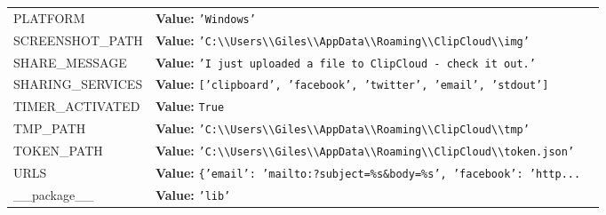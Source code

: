 \begin{longtable}{|p{\varnamewidth}|p{\vardescrwidth}|l}
\cline{1-2}
\raggedright P\-L\-A\-T\-F\-O\-R\-M\- & \raggedright \textbf{Value:} 
{\tt \texttt{'}\texttt{Windows}\texttt{'}}&\\
\cline{1-2}
\raggedright S\-C\-R\-E\-E\-N\-S\-H\-O\-T\-\_\-P\-A\-T\-H\- & \raggedright \textbf{Value:} 
{\tt \texttt{'}\texttt{C:{\textbackslash}{\textbackslash}Users{\textbackslash}{\textbackslash}Giles{\textbackslash}{\textbackslash}AppData{\textbackslash}{\textbackslash}Roaming{\textbackslash}{\textbackslash}ClipCloud{\textbackslash}{\textbackslash}img}\texttt{'}}&\\
\cline{1-2}
\raggedright S\-H\-A\-R\-E\-\_\-M\-E\-S\-S\-A\-G\-E\- & \raggedright \textbf{Value:} 
{\tt \texttt{'}\texttt{I just uploaded a file to ClipCloud - check it out.}\texttt{'}}&\\
\cline{1-2}
\raggedright S\-H\-A\-R\-I\-N\-G\-\_\-S\-E\-R\-V\-I\-C\-E\-S\- & \raggedright \textbf{Value:} 
{\tt \texttt{[}\texttt{'}\texttt{clipboard}\texttt{'}\texttt{, }\texttt{'}\texttt{facebook}\texttt{'}\texttt{, }\texttt{'}\texttt{twitter}\texttt{'}\texttt{, }\texttt{'}\texttt{email}\texttt{'}\texttt{, }\texttt{'}\texttt{stdout}\texttt{'}\texttt{]}}&\\
\cline{1-2}
\raggedright T\-I\-M\-E\-R\-\_\-A\-C\-T\-I\-V\-A\-T\-E\-D\- & \raggedright \textbf{Value:} 
{\tt True}&\\
\cline{1-2}
\raggedright T\-M\-P\-\_\-P\-A\-T\-H\- & \raggedright \textbf{Value:} 
{\tt \texttt{'}\texttt{C:{\textbackslash}{\textbackslash}Users{\textbackslash}{\textbackslash}Giles{\textbackslash}{\textbackslash}AppData{\textbackslash}{\textbackslash}Roaming{\textbackslash}{\textbackslash}ClipCloud{\textbackslash}{\textbackslash}tmp}\texttt{'}}&\\
\cline{1-2}
\raggedright T\-O\-K\-E\-N\-\_\-P\-A\-T\-H\- & \raggedright \textbf{Value:} 
{\tt \texttt{'}\texttt{C:{\textbackslash}{\textbackslash}Users{\textbackslash}{\textbackslash}Giles{\textbackslash}{\textbackslash}AppData{\textbackslash}{\textbackslash}Roaming{\textbackslash}{\textbackslash}ClipCloud{\textbackslash}{\textbackslash}token.json}\texttt{'}}&\\
\cline{1-2}
\raggedright U\-R\-L\-S\- & \raggedright \textbf{Value:} 
{\tt \texttt{\{}\texttt{'}\texttt{email}\texttt{'}\texttt{: }\texttt{'}\texttt{mailto:?subject=\%s\&body=\%s}\texttt{'}\texttt{, }\texttt{'}\texttt{facebook}\texttt{'}\texttt{: }\texttt{'}\texttt{http}\texttt{...}}&\\
\cline{1-2}
\raggedright \_\-\_\-p\-a\-c\-k\-a\-g\-e\-\_\-\_\- & \raggedright \textbf{Value:} 
{\tt \texttt{'}\texttt{lib}\texttt{'}}&\\
\cline{1-2}
\end{longtable}



